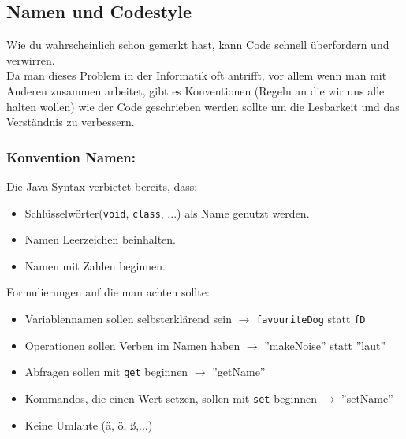 \subsection*{Namen und Codestyle}
Wie du wahrscheinlich schon gemerkt hast, kann Code schnell überfordern und verwirren.\\
Da man dieses Problem in der Informatik oft antrifft, vor allem wenn man mit Anderen zusammen arbeitet, gibt es Konventionen (Regeln an die wir uns alle halten wollen) wie der Code geschrieben werden sollte um die Lesbarkeit und das Verständnis zu verbessern.

\vspace{5mm}

\subsubsection*{Konvention Namen:}

\begin{Infobox}
	Die Java-Syntax verbietet bereits, dass:

	\begin{itemize}
		\item Schlüsselwörter(\lstinline{void}, \lstinline{class}, ...) als Name genutzt werden.
		\item Namen Leerzeichen beinhalten.
		\item Namen mit Zahlen beginnen.
	\end{itemize}
\end{Infobox}
\vspace{5mm}
\begin{Infobox}
	Formulierungen auf die man achten sollte:
	\begin{itemize}
		\item Variablennamen sollen selbsterklärend sein $\rightarrow$ \lstinline{favouriteDog} statt \lstinline{fD}
		\item Operationen sollen Verben im Namen haben $\rightarrow$ ''makeNoise'' statt ''laut''
		\item Abfragen sollen mit \lstinline{get} beginnen $\rightarrow$ ''getName''
		\item Kommandos, die einen Wert setzen, sollen mit \lstinline{set} beginnen $\rightarrow$ ''setName''
		\item Keine Umlaute (ä, ö, ß,...)

	\end{itemize}
\end{Infobox}

\vspace{5mm}

